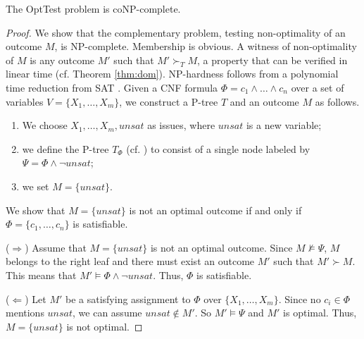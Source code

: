 \begin{thm}
\label{thm:opt_test}
	The {\sc OptTest} problem is coNP-complete.
\end{thm}
\begin{proof}
%
We show that the complementary problem, testing non-optimality of an outcome
$M$, is NP-complete. Membership is obvious. A witness of non-optimality of $M$
is any outcome $M'$ such that $M' \succ_T M$, a property that can be verified 
in linear time (cf. Theorem \ref{thm:dom}).
	NP-hardness follows from a polynomial time reduction from SAT \cite{Garey:1979}.
	Given a CNF formula $\Phi=c_1\land\ldots\land c_n$ over a set of variables
	$V=\{X_1,\ldots,X_m\}$, we construct a P-tree $T$ and an outcome $M$
as follows.
\begin{enumerate}
\item We choose $X_1,\ldots,X_m,unsat$ as issues, where $unsat$ is 
a new variable;
\item we define the P-tree $T_\Phi$ (cf. ) to consist of a 
single node labeled by $\Psi=\Phi \land \neg unsat$;
\item we set $M=\{unsat\}$.
\end{enumerate}

	We show that $M=\{unsat\}$ is not an optimal outcome if and only if
	$\Phi=\{c_1,\ldots,c_n\}$ is satisfiable.

\noindent
	($\Rightarrow$) Assume that $M=\{unsat\}$ is not an optimal outcome.
	Since $M \not \models \Psi$, $M$ belongs to the right
	leaf and there must exist an outcome $M'$ such that $M' \succ M$.
	This means that $M' \models \Phi \wedge \neg unsat$. Thus, 
	$\Phi$ is satisfiable.

\noindent
	($\Leftarrow$) Let $M'$ be a satisfying assignment to $\Phi$ over $\{X_1,\ldots,X_m\}$.
	Since no $c_i \in \Phi$ mentions $unsat$, we can assume $unsat \not \in M'$.
	So $M' \models \Psi$ and $M'$ is optimal.
	Thus, $M=\{unsat\}$ is not optimal.
\end{proof}

